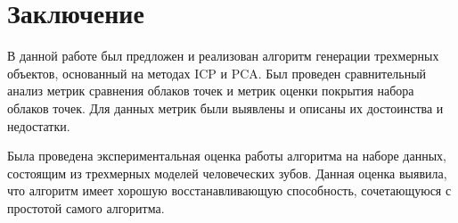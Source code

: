 \section{Заключение} \label{section:conclusion}

В данной работе был предложен и реализован алгоритм генерации трехмерных объектов, основанный на методах ICP и PCA. Был проведен сравнительный анализ метрик сравнения облаков точек и метрик оценки покрытия набора облаков точек. Для данных метрик были выявлены и описаны их достоинства и недостатки.


Была проведена экспериментальная оценка работы алгоритма на наборе данных, состоящим из трехмерных моделей человеческих зубов. Данная оценка выявила, что алгоритм имеет хорошую восстанавливающую способность, сочетающуюся с простотой самого алгоритма. 